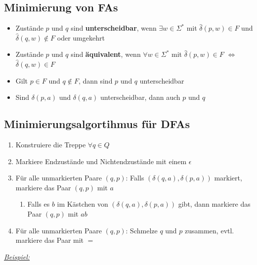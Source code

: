 \documentclass[ieeetran]{article}
\begin{document}
\subsection{Minimierung von FAs} %
\label{sub:minimierung_der_fAs}
\begin{itemize}
	\item Zustände $p$ und $q$ sind \textbf{unterscheidbar}, wenn $\exists w \in \Sigma^*$ mit $\hat{\delta}(p,w) \in F$ und $\hat{\delta}(q,w) \not\in F$ oder umgekehrt
\item Zustände $p$ und $q$ sind \textbf{äquivalent}, wenn $\forall w \in \Sigma^*$ mit $\hat{\delta}(p,w) \in F$ $\Leftrightarrow$ $\hat{\delta}(q,w) \in F$
\item Gilt $p \in F$ und $q \not\in F$, dann sind $p$ und $q$ unterscheidbar
\item Sind $\delta(p,a)$ und $\delta(q,a)$ unterscheidbar, dann auch $p$ und $q$


\end{itemize}

\subsection{Minimierungsalgortihmus für DFAs} %
\label{sub:minimierungsalgortihmus_für_dFAs}

\begin{enumerate}
  \item Konstruiere die Treppe $\forall q \in Q$
  \item Markiere Endzustände und Nichtendzustände mit einem $\epsilon$
  \item Für alle unmarkierten Paare $(q, p)$: Falls $(\delta(q, a), \delta(p, a))$ markiert, markiere das Paar $(q,p)$ mit $a$
	  \begin{enumerate}
	    \item Falls es $b$ im Kästchen von $(\delta(q, a), \delta(p, a))$ gibt, dann markiere das Paar $(q,p)$ mit $ab$
	  \end{enumerate}
  \item Für alle unmarkierten Paare $(q, p)$: Schmelze $q$ und $p$ zusammen, evtl. markiere das Paar mit $=$
\end{enumerate}

\pagebreak

\textit{\underline{Beispiel:}}
\end{document}
